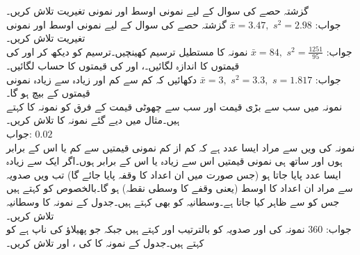 \quad
گزشتہ حصے کی سوال  کے لیے نمونی اوسط اور نمونی تغیریت تلاش کریں۔\\
جواب:\quad
$\bar{x}=3.47,\,\, s^2=2.98$
\quad
گزشتہ حصے کی سوال  کے لیے نمونی اوسط اور نمونی تغیریت تلاش کریں۔\\
جواب:\quad
$\bar{x}=84,\,\,s^2=\tfrac{1251}{95}$
\quad
نمونہ  کا مستطیل ترسیم کھینچیں۔ترسیم کو دیکھ کر  اور  کی قیمتوں کا اندازہ لگائیں۔،  اور  کی قیمتوں کا حساب لگائیں۔\\
جواب:\quad
$\bar{x}=3,\,\, s^2=3.3,\,\, s=1.817$
\quad
دکھائیں کہ کم سے کم اور زیادہ سے زیادہ نمونی قیمتوں کے بیچ  ہو گا۔
\quad {}\\
نمونہ میں سب سے بڑی قیمت اور سب سے چھوٹی قیمت کے فرق کو نمونہ کا  کہتے ہیں۔مثال  میں دیے گئے نمونہ کا  تلاش کریں۔\\
جواب:\quad
$0.02$
\quad {}\\
نمونہ کی  ویں  سے مراد ایسا عدد  ہے کہ کم از کم  نمونی قیمتیں  سے کم یا اس کے برابر ہوں اور ساتھ ہی  نمونی قیمتیں اس سے زیادہ یا اس کے برابر ہوں۔اگر ایک سے زیادہ ایسا عدد پایا جاتا ہو (جس صورت میں ان اعداد کا وقفہ پایا جائے گا) تب  ویں صدویہ سے مراد ان اعداد کا اوسط (یعنی وقفے  کا وسطی نقطہ) ہو گا۔بالخصوص  کو  کہتے ہیں جس کو  سے ظاہر کیا جاتا ہے۔وسطانیہ کو  بھی کہتے ہیں۔جدول  کے نمونہ  کا وسطانیہ  تلاش کریں۔\\
جواب:\quad
$360$
\quad 
نمونہ کی  اور  صدویہ کو بالترتیب  اور  کہتے ہیں جبکہ  جو پھیلاؤ کی ناپ ہے کو  کہتے ہیں۔جدول  کے نمونہ  کا کی ،  اور  تلاش کریں۔\\
